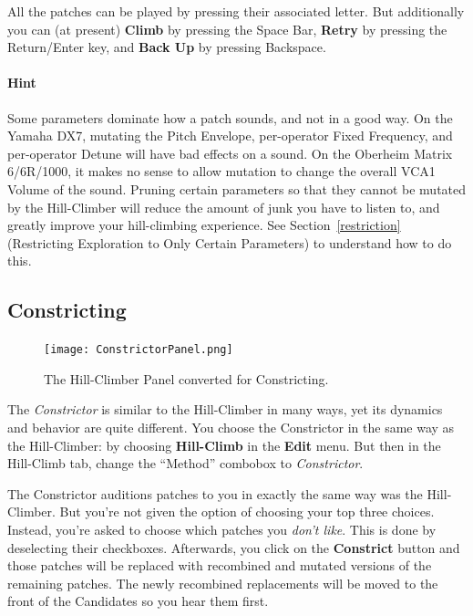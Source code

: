 \documentclass{article}
\begin{document}
All the patches can be played by pressing their associated letter.  But additionally you can (at present) {\bf Climb} by pressing the Space Bar, {\bf Retry} by pressing the Return/Enter key, and {\bf Back Up} by pressing Backspace.

\paragraph{\color{red}Hint} Some parameters dominate how a patch sounds, and not in a good way.  On the Yamaha DX7, mutating the Pitch Envelope, per-operator Fixed Frequency, and per-operator Detune will have bad effects on a sound.  On the Oberheim Matrix 6/6R/1000, it makes no sense to allow mutation to change the overall VCA1 Volume of the sound.   Pruning certain parameters so that they cannot be mutated by the Hill-Climber will reduce the amount of junk you have to listen to, and greatly improve your hill-climbing experience. See Section~\ref{restriction} (Restricting Exploration to Only Certain Parameters) to understand how to do this.

\subsection{Constricting}
\label{constrict}

\begin{figure}
\vspace{-2em}\texttt{[image: ConstrictorPanel.png]}
\vspace{-3em}
\caption{The Hill-Climber Panel converted for Constricting.}
\vspace{-1em}
\label{constrictorpanel}
\end{figure}

The {\it Constrictor} is similar to the Hill-Climber in many ways, yet its dynamics and behavior are quite different.   You choose the Constrictor in the same way as the Hill-Climber: by choosing {\bf Hill-Climb} in the {\bf Edit} menu.  But then in the Hill-Climb tab, change the ``Method'' combobox to {\it Constrictor}.    

The Constrictor auditions patches to you in exactly the same way was the Hill-Climber.  But you're not given the option of choosing your top three choices.  Instead, you're asked to choose which patches you {\it don't like}.  This is done by deselecting their checkboxes.  Afterwards, you click on the {\bf Constrict} button and those patches will be replaced with recombined and mutated versions of the remaining patches.  The newly recombined replacements will be moved to the front of the Candidates so you hear them first.
\end{document}
